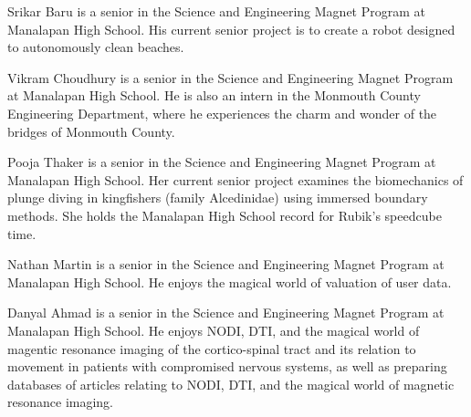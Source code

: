 ﻿\documentclass[10pt,journal,twoside]{IEEEtran}
\begin{document}
\nocite{libre,tipler}



\begin{IEEEbiography}{Srikar Baru} is a senior in the Science and Engineering Magnet Program at Manalapan High School. His current senior project is to create a robot designed to autonomously clean beaches. 
\end{IEEEbiography}
\begin{IEEEbiography}{Vikram Choudhury} is a senior in the Science and Engineering Magnet Program at Manalapan High School. He is also an intern in the Monmouth County Engineering Department, where he experiences the charm and wonder of the bridges of Monmouth County. 
\end{IEEEbiography}
\begin{IEEEbiography}{Pooja Thaker} is a senior in the Science and Engineering Magnet Program at Manalapan High School. Her current senior project examines the biomechanics of plunge diving in kingfishers (family Alcedinidae) using immersed boundary methods. She holds the Manalapan High School record for  Rubik's speedcube time. 
\end{IEEEbiography}
\begin{IEEEbiography}{Nathan Martin} is a senior in the Science and Engineering Magnet Program at Manalapan High School. He enjoys the magical world of valuation of user data. 
\end{IEEEbiography}
\begin{IEEEbiography}{Danyal Ahmad} is a senior in the Science and Engineering Magnet Program at Manalapan High School. He enjoys NODI, DTI, and the magical world of magentic resonance imaging of the cortico-spinal tract and its relation to movement in patients with compromised nervous systems, as well as preparing databases of articles relating to NODI, DTI, and the magical world of magnetic resonance imaging. 
\end{IEEEbiography}
\end{document}

